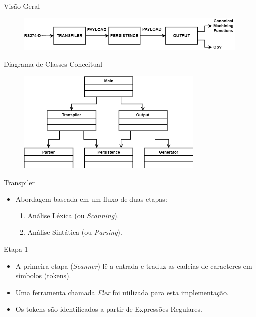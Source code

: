 \documentclass[aspectratio=169]{beamer}
\begin{document}
{\begin{frame}{Visão Geral}

  \begin{figure}[H]
    \centering
    \includegraphics[width=\textwidth]{images/idef0-main.png}
  \end{figure}

\end{frame}


\begin{frame}{Diagrama de Classes Conceitual}

  \begin{figure}[H]
    \centering
    \includegraphics[width=90mm]{images/class-main.png}
  \end{figure}

\end{frame}


\begin{frame}{Transpiler}
  \begin{itemize}
    \item Abordagem baseada em um fluxo de duas etapas:
    \begin{enumerate}
      \item Análise Léxica (ou \emph{Scanning}).
      \item Análise Sintática (ou \emph{Parsing}).
    \end{enumerate}
  \end{itemize}
\end{frame}


\begin{frame}{Etapa 1}
  \begin{itemize}
    \item A primeira etapa (\emph{Scanner}) l\^e a entrada e traduz as 
          cadeias de caracteres em símbolos (tokens). 
    \item Uma ferramenta chamada \emph{Flex} foi utilizada para esta 
          implementa\c c\~ao.
    \item Os tokens são identificados a partir de Expressões Regulares.
  \end{itemize}
\end{frame}


}
\end{document}
